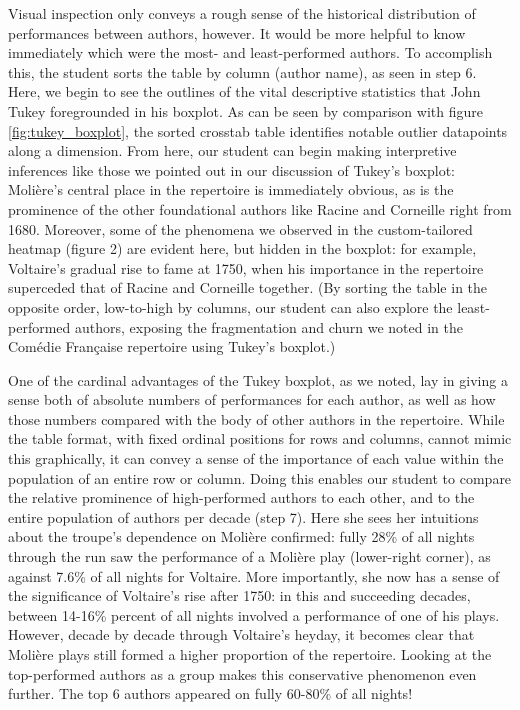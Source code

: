 \documentclass[	DIV=calc,%
							paper=a4,%
							fontsize=11pt,%
							twocolumn]{scrartcl}	 					%
\begin{document}
Visual inspection only conveys a rough sense of the historical distribution of performances between authors, however.  It would be more helpful to know immediately which were the most- and least-performed authors.  To accomplish this, the student sorts the table by column (author name), as seen in step 6.  Here, we begin to see the outlines of the vital descriptive statistics that John Tukey foregrounded in his boxplot.  As can be seen by comparison with figure \ref{fig:tukey_boxplot}, the sorted crosstab table identifies notable outlier datapoints along a dimension.  From here, our student can begin making interpretive inferences like those we pointed out in our discussion of Tukey’s boxplot: Molière’s central place in the repertoire is immediately obvious, as is the prominence of the other foundational authors like Racine and Corneille right from 1680.  Moreover, some of the phenomena we observed in the custom-tailored heatmap (figure 2) are evident here, but hidden in the boxplot: for example, Voltaire’s gradual rise to fame at 1750, when his importance in the repertoire superceded that of Racine and Corneille together.  (By sorting the table in the opposite order, low-to-high by columns, our student can also explore the least-performed authors, exposing  the fragmentation and churn we noted in the Comédie Française repertoire using Tukey’s boxplot.)

One of the cardinal advantages of the Tukey boxplot, as we noted, lay in giving a sense both of absolute numbers of performances for each author, as well as how those numbers compared with the body of other authors in the repertoire.  While the table format, with fixed ordinal positions for rows and columns, cannot mimic this graphically, it can convey a sense of the importance of each value within the population of an entire row or column.  Doing this enables our student to compare the relative prominence of high-performed authors to each other, and to the entire population of authors per decade (step 7).  Here she sees her intuitions about the troupe’s dependence on Molière confirmed: fully 28\% of all nights through the run saw the performance of a Molière play (lower-right corner), as against 7.6\% of all nights for Voltaire.  More importantly, she now has a sense of the significance of Voltaire’s rise after 1750: in this and succeeding decades, between 14-16\% percent of all nights involved a performance of one of his plays.  However, decade by decade through Voltaire’s heyday, it becomes clear that Molière plays still formed a higher proportion of the repertoire.  Looking at the top-performed authors as a group makes this conservative phenomenon even further.  The top 6 authors appeared on fully 60-80\% of all nights!
\end{document}
